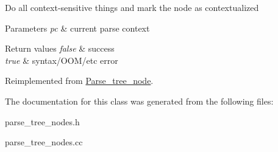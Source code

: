 Do all context-\/sensitive things and mark the node as contextualized


\begin{DoxyParams}{Parameters}
{\em pc} & current parse context\\
\hline
\end{DoxyParams}

\begin{DoxyRetVals}{Return values}
{\em false} & success \\
\hline
{\em true} & syntax/\+O\+O\+M/etc error \\
\hline
\end{DoxyRetVals}


Reimplemented from \mbox{\hyperlink{classParse__tree__node_a22d93524a537d0df652d7efa144f23da}{Parse\+\_\+tree\+\_\+node}}.



The documentation for this class was generated from the following files\+:\begin{DoxyCompactItemize}
\item 
parse\+\_\+tree\+\_\+nodes.\+h\item 
parse\+\_\+tree\+\_\+nodes.\+cc\end{DoxyCompactItemize}
